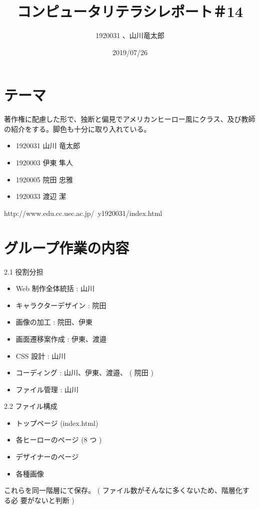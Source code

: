\usepackage{graphicx}
\usepackage{url}

\title{コンピュータリテラシレポート＃14}
\author{1920031 、山川竜太郎}
\date{2019/07/26}
\maketitle

\section{テーマ}
著作権に配慮した形で、独断と偏見でアメリカンヒーロー風にクラス、及び教師の紹介をする。脚色も十分に取り入れている。

\begin{itemize}
  \item 1920031 山川 竜太郎
  \item 1920003 伊東 隼人
  \item 1920005 院田 忠雅
  \item 1920033 渡辺 潔
\end{itemize}



http://www.edu.cc.uec.ac.jp/~y1920031/index.html

\section{グループ作業の内容}
2.1
役割分担\newline
\begin{itemize}
  \item Web 制作全体統括 : 山川
  \item キャラクターデザイン : 院田
  \item 画像の加工 : 院田、伊東
  \item 画面遷移案作成 : 伊東、渡邉
  \item CSS 設計 : 山川
  \item コーディング : 山川、伊東、渡邉、 ( 院田 )
  \item ファイル管理 : 山川
\end{itemize}

2.2
ファイル構成\newline
\begin{itemize}
  \item トップページ (index.html)
  \item 各ヒーローのページ (8 つ )
  \item デザイナーのページ
  \item 各種画像

\end{itemize}
これらを同一階層にて保存。 ( ファイル数がそんなに多くないため、階層化する必
要がないと判断 )\newline



